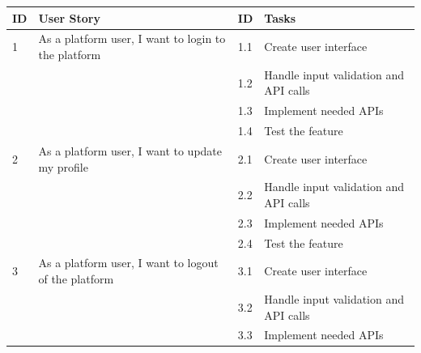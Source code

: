 \normalsize
\begin{longtable}{|p{1cm}|p{7cm}|p{1cm}|p{7cm}|}
    \hline
    \rowcolor{green!20} \textbf{ID} & \textbf{User Story}                                           & \textbf{ID} & \textbf{Tasks}                        \\ \hline
    1                               & As a platform user, I want to login to the platform           & 1.1         & Create user interface                 \\ \cline{3-4}
                                    &                                                               & 1.2         & Handle input validation and API calls \\ \cline{3-4}
                                    &                                                               & 1.3         & Implement needed APIs                 \\ \cline{3-4}
                                    &                                                               & 1.4         & Test the feature                      \\ \hline
    2                               & As a platform user, I want to update my profile               & 2.1         & Create user interface                 \\ \cline{3-4}
                                    &                                                               & 2.2         & Handle input validation and API calls \\ \cline{3-4}
                                    &                                                               & 2.3         & Implement needed APIs                 \\ \cline{3-4}
                                    &                                                               & 2.4         & Test the feature                      \\ \hline
    3                               & As a platform user, I want to logout of the platform          & 3.1         & Create user interface                 \\ \cline{3-4}
                                    &                                                               & 3.2         & Handle input validation and API calls \\ \cline{3-4}
                                    &                                                               & 3.3         & Implement needed APIs                 \\ \cline{3-4}

\end{longtable}
